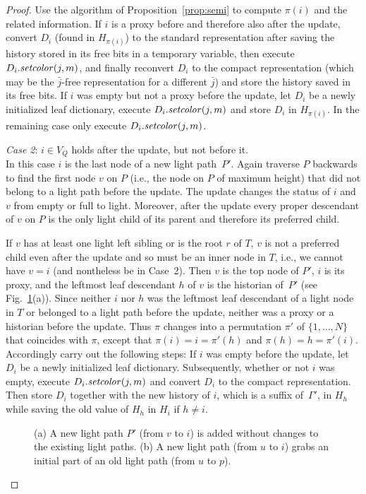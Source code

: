 \documentclass[envcountsame,envcountsect,undated,nolinenumbers]{lnthi}
\def\Tvn#1{\hbox{\textit{#1\/}}}
\def\jj{{\bar j}}
\begin{document}
\begin{proof}
Use the algorithm of Proposition~\ref{prop:semi}
to compute $\pi(i)$ and the related information.
If $i$ is a proxy before and therefore also after
the update, convert $D_i$
(found in $H_{\pi(i)}$) to the standard representation
after saving the history stored in its free bits
in a temporary variable, then execute
$D_{i}.\Tvn{setcolor}(j,m)$, and finally reconvert
$D_i$ to the compact representation
(which may be the $\jj$-free representation for
a different $\jj$) and
store the history saved in its free bits.
If $i$ was empty but not a proxy before the update,
let $D_i$ be a newly initialized leaf dictionary, execute
$D_{i}.\Tvn{setcolor}(j,m)$ and store $D_i$ in $H_{\pi(i)}$.
In the remaining case only execute
$D_{i}.\Tvn{setcolor}(j,m)$.

\medskip
\emph{Case 2}:
$i\in V_Q$ holds
after the update, but not before it.\\
In this case $i$ is the last node of
a new light path~$P'$.
Again traverse $P$ backwards to find the
first node $v$ on $P$ (i.e., the node on
$P$ of maximum height) that did not belong to
a light path before the update.
The update changes the status of $i$ and~$v$
from empty or full to light.
Moreover, after the update every proper descendant of $v$
on $P$ is the only light child of its parent
and therefore its preferred child.

If $v$ has at least one light left sibling
or is the root $r$ of $T$,
$v$ is not a preferred child even
after the update and so
must be an inner node in $T$,
i.e., we cannot have $v=i$ (and
nontheless be in Case~2).
Then $v$ is the top node of $P'$,
$i$ is its proxy,
and the leftmost leaf descendant $h$
of $v$ is the historian of~$P'$ 
(see Fig.~\ref{fig:setcolor}(a)).
Since neither $i$ nor $h$ was the leftmost
leaf descendant
of a light node in $T$ or
belonged to a light path before
the update, neither was a proxy or a
historian before the update.
Thus $\pi$ changes into a permutation $\pi'$
of $\{1,\ldots,N\}$ that coincides with $\pi$, except that
$\pi(i)=i=\pi'(h)$ and
$\pi(h)=h=\pi'(i)$.
Accordingly carry out the following steps:
If $i$ was empty before the update,
let $D_i$ be a newly initialized leaf dictionary.
Subsequently, whether or not $i$ was empty,
execute $D_{i}.\Tvn{setcolor}(j,m)$
and convert $D_i$ to the compact representation.
Then store $D_i$ together with
the new history of $i$, which
is a suffix of~$\Gamma'$, in $H_h$
while
saving the old value of $H_h$ in $H_i$ if $h\not=i$.

\begin{figure}
\begin{center}
\end{center}
\caption{(a) A new light path $P'$ (from $v$ to $i$)
is added without changes to the existing light paths.
(b) A new light path (from $u$ to $i$)
grabs an initial part of an old light path (from $u$ to $p$).}
\label{fig:setcolor}
\end{figure}


\end{proof}
\end{document}

